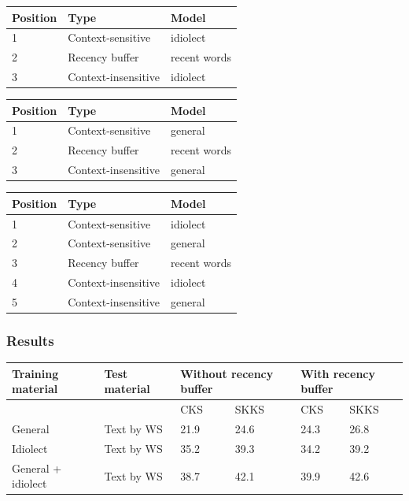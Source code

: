 \documentclass[11pt]{article}
\let\originaltable\table
\let\endoriginaltable\endtable
\renewenvironment{table}[1][ht]{%
  \originaltable[#1]
  \centering}%
  {\endoriginaltable}
\begin{document}
\begin{table}[H]
\begin{tabular}{lll} 
Position&Type&Model\\
\hline
1&Context-sensitive&idiolect\\
2&Recency buffer&recent words\\
3&Context-insensitive&idiolect\\
\end{tabular} 
\caption{The module order for simulation 1, with the idiolect model and the recency buffer} 
\end{table}

\begin{table}[H]
\begin{tabular}{lll} 
Position&Type&Model\\
\hline
1&Context-sensitive&general\\
2&Recency buffer&recent words\\
3&Context-insensitive&general\\
\end{tabular} 
\caption{The module order for simulation 2, with the general model and the recency buffer} 
\end{table}

\begin{table}[H]
\begin{tabular}{lll} 
Position&Type&Model\\
\hline
1&Context-sensitive&idiolect\\
2&Context-sensitive&general\\
3&Recency buffer&recent words\\
4&Context-insensitive&idiolect\\
5&Context-insensitive&general\\
\end{tabular} 
\caption{The module order for simulation 3, with the idiolect model, the general model and the recency buffer} \label{sim3}
\end{table}


\subsubsection{Results} 

\begin{table}[H] 
\centering
\begin{tabular}{ll|llll} 
Training material&Test material&\multicolumn{2}{l}{Without recency buffer}&\multicolumn{2}{l}{With recency buffer}\\
\hline
&&CKS&SKKS&CKS&SKKS\\
General&Text by WS&21.9&24.6&24.3&26.8\\
Idiolect&Text by WS&35.2&39.3&34.2&39.2\\
General + idiolect&Text by WS&38.7&42.1&39.9&42.6\\
\end{tabular} 
\caption{Percentage of keystrokes that can be saved with and without the recency buffer} \label{recbuf_results}
\end{table}
\end{document}

